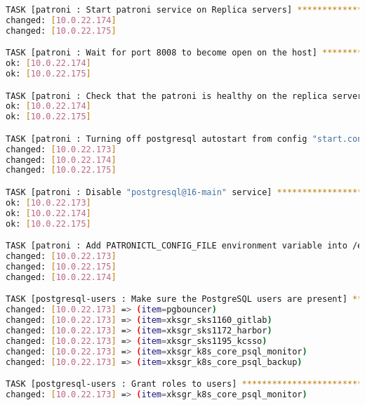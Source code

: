 \begin{flushleft}
\begin{lstlisting}[language=bash, caption=Deploy - Anhang - Deployt,captionpos=b,label={lst:deploy-appendix-deployt},breaklines=true]
TASK [patroni : Start patroni service on Replica servers] *********************************************************************************************************************************************************
changed: [10.0.22.174]
changed: [10.0.22.175]

TASK [patroni : Wait for port 8008 to become open on the host] ****************************************************************************************************************************************************
ok: [10.0.22.174]
ok: [10.0.22.175]

TASK [patroni : Check that the patroni is healthy on the replica server] ******************************************************************************************************************************************
ok: [10.0.22.174]
ok: [10.0.22.175]

TASK [patroni : Turning off postgresql autostart from config "start.conf" (will be managed by patroni)] ***********************************************************************************************************
changed: [10.0.22.173]
changed: [10.0.22.174]
changed: [10.0.22.175]

TASK [patroni : Disable "postgresql@16-main" service] *************************************************************************************************************************************************************
ok: [10.0.22.173]
ok: [10.0.22.174]
ok: [10.0.22.175]

TASK [patroni : Add PATRONICTL_CONFIG_FILE environment variable into /etc/environment] ****************************************************************************************************************************
changed: [10.0.22.173]
changed: [10.0.22.175]
changed: [10.0.22.174]

TASK [postgresql-users : Make sure the PostgreSQL users are present] **********************************************************************************************************************************************
changed: [10.0.22.173] => (item=pgbouncer)
changed: [10.0.22.173] => (item=xksgr_sks1160_gitlab)
changed: [10.0.22.173] => (item=xksgr_sks1172_harbor)
changed: [10.0.22.173] => (item=xksgr_sks1195_kcsso)
changed: [10.0.22.173] => (item=xksgr_k8s_core_psql_monitor)
changed: [10.0.22.173] => (item=xksgr_k8s_core_psql_backup)

TASK [postgresql-users : Grant roles to users] ********************************************************************************************************************************************************************
changed: [10.0.22.173] => (item=xksgr_k8s_core_psql_monitor)


\end{lstlisting}
\end{flushleft}
